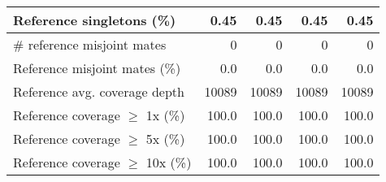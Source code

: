 \documentclass[12pt,a4paper]{article}
\begin{document}
\begin{table}[ht]
\begin{center}
\begin{tabular}{|l*{4}{|r}|}
Reference singletons (\%) & 0.45 & 0.45 & 0.45 & 0.45 \\ \hline
\# reference misjoint mates & 0 & 0 & 0 & 0 \\ \hline
Reference misjoint mates (\%) & 0.0 & 0.0 & 0.0 & 0.0 \\ \hline
Reference avg. coverage depth & 10089 & 10089 & 10089 & 10089 \\ \hline
Reference coverage $\geq$ 1x (\%) & 100.0 & 100.0 & 100.0 & 100.0 \\ \hline
Reference coverage $\geq$ 5x (\%) & 100.0 & 100.0 & 100.0 & 100.0 \\ \hline
Reference coverage $\geq$ 10x (\%) & 100.0 & 100.0 & 100.0 & 100.0 \\ \hline
\end{tabular}
\end{center}
\end{table}
\end{document}
